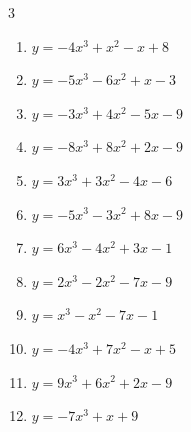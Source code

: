 \begin{multicols}{3}
\begin{enumerate}

  \item $y=-4x^{3}+x^{2}-x+8$


\columnbreak %

  \item $y=-5x^{3}-6x^{2}+x-3$


  \item $y=-3x^{3}+4x^{2}-5x-9$


  \item $y=-8x^{3}+8x^{2}+2x-9$


  \item $y=3x^{3}+3x^{2}-4x-6$


  \item $y=-5x^{3}-3x^{2}+8x-9$


  \item $y=6x^{3}-4x^{2}+3x-1$


  \item $y=2x^{3}-2x^{2}-7x-9$


  \item $y=x^{3}-x^{2}-7x-1$


  \item $y=-4x^{3}+7x^{2}-x+5$


  \item $y=9x^{3}+6x^{2}+2x-9$


  \item $y=-7x^{3}+x+9$



\end{enumerate}
\end{multicols}
